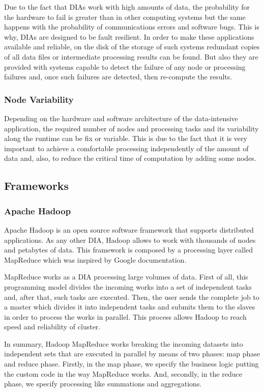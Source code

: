 Due to the fact that DIAs work with high amounts of data, the probability for the hardware to fail is greater than in other computing systems but the same happens with the probability of communications errors and software bugs. This is why, DIAs are designed to be fault resilient. In order to make these applications available and reliable, on the disk of the storage of such systems redundant copies of all data files or intermediate processing results can be found. But also they are provided with systems capable to detect the failure of any node or processing failures and, once such failures are detected, then re-compute the results.

\subsubsection*{Node Variability}

Depending on the hardware and software architecture of the data-intensive application, the required number of nodes and processing tasks and its variability along the runtime can be fix or variable. This is due to the fact that it is very important to achieve a comfortable processing independently of the amount of data and, also, to reduce the critical time of computation by adding some nodes.

\subsection{Frameworks}
\subsubsection{Apache Hadoop}

Apache Hadoop is an open source software framework that supports distributed applications. As any other DIA, Hadoop allows to work with thousands of nodes and petabytes of data. This framework is composed by a processing layer called MapReduce which was inspired by Google documentation.

MapReduce works as a DIA processing large volumes of data. First of all, this programming model divides the incoming works into a set of independent tasks and, after that, such tasks are executed. Then, the user sends the complete job to a master which divides it into independent tasks and submits them to the slaves in order to process the works in parallel. This process allows Hadoop to reach speed and reliability of cluster.

In summary, Hadoop MapReduce works breaking the incoming datasets into independent sets that are executed in parallel by means of two phases: map phase and reduce phase. Firstly, in the map phase, we specify the business logic putting the custom code in the way MapReduce works. And, secondly, in the reduce phase, we specify processing like summations and aggregations.

